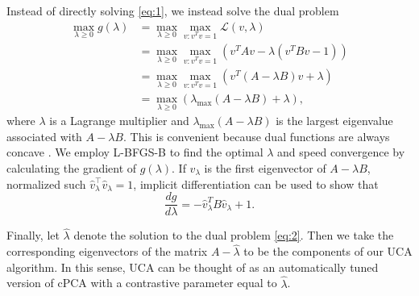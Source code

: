 \documentclass[12pt]{article}
\begin{document}

Instead of directly solving \eqref{eq:1}, we instead solve the dual problem
\begin{align}
  \max_{\lambda \geq 0}{g(\lambda)} &= \max_{\lambda \geq 0}{\max_{v : v^T v = 1}{\mathcal{L}}}\left(v,\lambda\right) \nonumber\\
                                        &= \max_{\lambda \geq 0}{\max_{v: v^T v = 1}{\left( v^TAv - \lambda\left(v^TBv - 1\right)\right)}} \nonumber\\
                                        &= \max_{\lambda \geq 0}{\max_{v: v^T v = 1}{\left(v^T\left(A - \lambda B\right)v + \lambda\right)}}\nonumber\\
                                        &= \max_{\lambda \geq 0}{\left(\lambda_{\text{max}}\left(A - \lambda B\right) + \lambda\right)}, \label{eq:2}
\end{align}
where $\lambda$ is a Lagrange multiplier and $\lambda_{\max}(A - \lambda B)$ is the largest eigenvalue associated with $A - \lambda B$. This is convenient because dual functions are always concave \cite{boyd2004convex}. We employ L-BFGS-B \cite{byrd1995limited} to find the optimal $\lambda$ and speed convergence by calculating the gradient of $g(\lambda)$. If $\hat{v}_\lambda$ is the first eigenvector of $A - \lambda B$, normalized such $\hat{v}_{\lambda}^\top \hat{v}_{\lambda} = 1$, implicit differentiation can be used to show that
\[
  \frac{d g}{d \lambda} = - \hat{v}^T _{\lambda} B \hat{v}_{\lambda} + 1.
\]

Finally, let $\hat{\lambda}$ denote the solution to the dual problem \eqref{eq:2}. Then we take the corresponding eigenvectors of the matrix $A - \hat{\lambda}$ to be the components of our UCA algorithm. In this sense, UCA can be thought of as an automatically tuned version of cPCA with a contrastive parameter equal to $\hat{\lambda}$.
\end{document}
